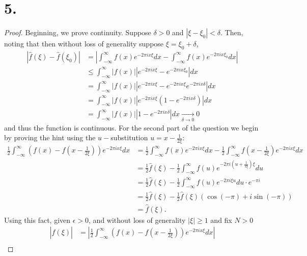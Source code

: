 \documentclass{article}
\begin{document}
\section*{5.}
\begin{proof}
    Beginning, we prove continuity. Suppose $\delta > 0$ and $|\xi - \xi_0| < \delta$. Then, noting that then without loss of generality suppose $\xi = \xi_0 + \delta$, 
    \begin{align*}
        |\hat{f}(\xi) - \hat{f}(\xi_0)| &= \left|\int_{-\infty}^{\infty}f(x)e^{-2 \pi i x \xi}dx - \int_{-\infty}^{\infty}f(x)e^{-2 \pi ix \xi_0}dx \right| \\
        &\leq \int_{-\infty}^{\infty}|f(x)|\left|e^{-2\pi i x \xi} - e^{-2 \pi i x \xi_0} \right|dx \\
        &= \int_{-\infty}^{\infty}|f(x)|\left|e^{-2 \pi i x \xi} - e^{-2\pi ix \xi}e^{-2\pi ix \delta} \right|dx \\
        &= \int_{-\infty}^{\infty}|f(x)|\left|e^{-2 \pi i x \xi}\left(1 - e^{-2 \pi ix \delta} \right) \right|dx \\
        &= \int_{-\infty}^{\infty}|f(x)|\left|1 - e^{-2 \pi i x \delta} \right|dx \xrightarrow[\delta \to 0]{} 0
    \end{align*}
    and thus the function is continuous.  
   For the second part of the question we begin by proving the hint using the $u-$substitution $u = x - \frac{1}{2 \xi}$:
   \begin{align*}
    \frac{1}{2}\int_{-\infty}^{\infty} \left(f(x) - f\left(x - \frac{1}{2 \xi} \right)\right)e^{-2\pi ix \xi}dx &= \frac{1}{2} \int_{-\infty}^{\infty}f(x)e^{-2 \pi i x \xi}dx - \frac{1}{2}\int_{-\infty}^{\infty}f \left(x - \frac{1}{2 \xi} \right)e^{-2 \pi i x \xi}dx \\
    &= \frac{1}{2}\hat{f}(\xi) - \frac{1}{2}\int_{-\infty}^{\infty}f(u)e^{-2 \pi i \left(u+ \frac{1}{2 \xi}\right)\xi} du \\
    &= \frac{1}{2}\hat{f}(\xi) - \frac{1}{2}\int_{-\infty}^{\infty}f(u)e^{-2 \pi i \xi u} du \cdot e^{-\pi i } \\
    &= \frac{1}{2} \hat{f}(\xi) - \frac{1}{2}\hat{f}(\xi)(\cos(-\pi) + i \sin(-\pi)) \\
    &= \hat{f}(\xi).
   \end{align*} 
   Using this fact, given $\epsilon > 0$, and without loss of generality $|\xi| \geq 1$ and fix $N > 0$
   \begin{align*}
    |\hat{f}(\xi)| &= \left|\frac{1}{2}\int_{-\infty}^{\infty} \left(f(x) - f\left(x - \frac{1}{2\xi} \right) \right)e^{-2 \pi i x \xi} dx \right| \\

\end{align*}
\end{proof}
\end{document}
